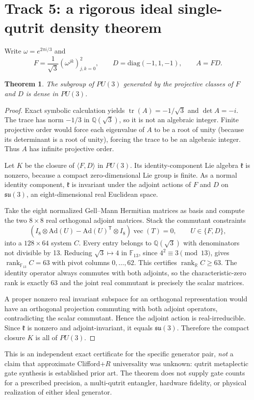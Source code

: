 \documentclass[10pt]{article}
\newtheorem{theorem}{Theorem}
\begin{document}
\section{Track 5: a rigorous ideal single-qutrit density theorem}
Write $\omega=e^{2\pi i/3}$ and
\[
F=\frac1{\sqrt3}(\omega^{jk})_{j,k=0}^2,\qquad
D=\mathrm{diag}(-1,1,-1),\qquad A=FD.
\]
\begin{theorem}
The subgroup of $PU(3)$ generated by the projective classes
of $F$ and $D$ is dense in $PU(3)$.
\end{theorem}
\begin{proof}
Exact symbolic calculation yields
$\operatorname{tr}(A)=-1/\sqrt3$ and $\det A=-i$.
The trace has norm $-1/3$ in $\mathbb Q(\sqrt3)$, so it
is not an algebraic integer. Finite projective order would
force each eigenvalue of $A$ to be a root of unity
(because its determinant is a root of unity), forcing
the trace to be an algebraic integer. Thus $A$ has
infinite projective order.

Let $K$ be the closure of $\langle F,D\rangle$ in $PU(3)$.
Its identity-component Lie algebra $\mathfrak k$ is nonzero,
because a compact zero-dimensional Lie group is finite.
As a normal identity component, $\mathfrak k$ is invariant
under the adjoint actions of $F$ and $D$ on
$\mathfrak{su}(3)$, an eight-dimensional real Euclidean space.

Take the eight normalized Gell--Mann Hermitian matrices as
basis and compute the two $8\times8$ real orthogonal adjoint
matrices. Stack the commutant constraints
\[
(I_8\otimes\mathrm{Ad}(U)
 -\mathrm{Ad}(U)^{\mathsf T}\otimes I_8)
 \operatorname{vec}(T)=0,\qquad U\in\{F,D\},
\]
into a $128\times64$ system $C$. Every entry belongs to
$\mathbb Q(\sqrt3)$ with denominators not divisible by 13.
Reducing $\sqrt3\mapsto4$ in $\mathbb F_{13}$, since
$4^2\equiv3\pmod{13}$, gives
$\operatorname{rank}_{\mathbb F_{13}}C=63$
with pivot columns $0,\ldots,62$. This certifies
$\operatorname{rank}_{\mathbb R}C\ge63$.
The identity operator always commutes with both adjoints,
so the characteristic-zero rank is exactly 63 and the
joint real commutant is precisely the scalar matrices.

A proper nonzero real invariant subspace for an orthogonal
representation would have an orthogonal projection
commuting with both adjoint operators, contradicting
the scalar commutant. Hence the adjoint action is
real-irreducible. Since $\mathfrak k$ is nonzero and
adjoint-invariant, it equals $\mathfrak{su}(3)$.
Therefore the compact closure $K$ is all of $PU(3)$.
\end{proof}
This is an independent exact certificate for the
specific generator pair, \emph{not} a claim that
approximate Clifford+$R$ universality was unknown:
qutrit metaplectic gate synthesis is established prior art.
The theorem does not supply gate counts for a prescribed
precision, a multi-qutrit entangler, hardware fidelity,
or physical realization of either ideal generator.
\end{document}

